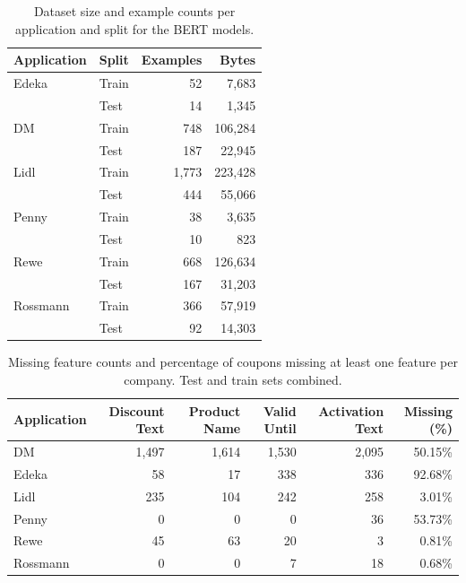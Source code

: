 \documentclass[licencjacka,en]{pracamgr}
\begin{document}
\begin{table}[h!]
\centering
\begin{tabular}{|l|l|r|r|}
\hline
\textbf{Application} & \textbf{Split} & \textbf{Examples} & \textbf{Bytes} \\
\hline
Edeka     & Train & 52  & 7,683 \\
          & Test  & 14  & 1,345 \\
DM        & Train & 748 & 106,284 \\
          & Test  & 187 & 22,945 \\
Lidl      & Train & 1,773 & 223,428 \\
          & Test  & 444  & 55,066 \\
Penny     & Train & 38  & 3,635 \\
          & Test  & 10  & 823 \\
Rewe      & Train & 668 & 126,634 \\
          & Test  & 167 & 31,203 \\
Rossmann  & Train & 366 & 57,919 \\
          & Test  & 92  & 14,303 \\
\hline
\end{tabular}
\caption{Dataset size and example counts per application and split for the BERT models.}
\end{table}

\begin{table}[h!]
\raggedright
\setlength{\tabcolsep}{4pt}
\small %
\begin{tabular}{|l|r|r|r|r|r|}
\hline
\textbf{Application} & \textbf{Discount Text} & \textbf{Product Name} & \textbf{Valid Until} & \textbf{Activation Text} & \textbf{Missing (\%)} \\
\hline
DM        & 1,497 & 1,614 & 1,530 & 2,095 & 50.15\% \\
Edeka     & 58    & 17    & 338   & 336   & 92.68\% \\
Lidl      & 235   & 104   & 242   & 258   & 3.01\% \\
Penny     & 0     & 0     & 0     & 36    & 53.73\% \\
Rewe      & 45    & 63    & 20    & 3     & 0.81\% \\
Rossmann  & 0     & 0     & 7     & 18    & 0.68\% \\
\hline
\end{tabular}
\caption{Missing feature counts and percentage of coupons missing at least one feature per company. Test and train sets combined.}
\label{tab:missing_coupons}
\end{table}
\end{document}
